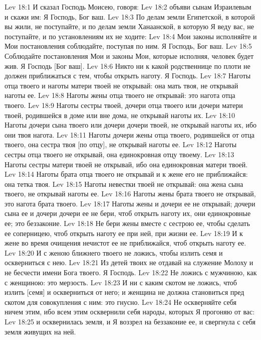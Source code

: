 \vs Lev 18:1 И сказал Господь Моисею, говоря:
\vs Lev 18:2 объяви сынам Израилевым и скажи им: Я Господь, Бог ваш.
\vs Lev 18:3 По делам земли Египетской, в которой вы жили, не поступайте, и по делам земли Ханаанской, в которую Я веду вас, не поступайте, и по установлениям их не ходите:
\vs Lev 18:4 Мои законы исполняйте и Мои постановления соблюдайте, поступая по ним. Я Господь, Бог ваш.
\vs Lev 18:5 Соблюдайте постановления Мои и законы Мои, которые исполняя, человек будет жив. Я Господь [Бог ваш].
\rsbpar\vs Lev 18:6 Никто ни к какой родственнице по плоти не должен приближаться с тем, чтобы открыть наготу. Я Господь.
\vs Lev 18:7 Наготы отца твоего и наготы матери твоей не открывай: она мать твоя, не открывай наготы ее.
\vs Lev 18:8 Наготы жены отца твоего не открывай: это нагота отца твоего.
\vs Lev 18:9 Наготы сестры твоей, дочери отца твоего или дочери матери твоей, родившейся в доме или вне дома, не открывай наготы их.
\vs Lev 18:10 Наготы дочери сына твоего или дочери дочери твоей, не открывай наготы их, ибо они твоя нагота.
\vs Lev 18:11 Наготы дочери жены отца твоего, родившейся от отца твоего, она сестра твоя [по отцу], не открывай наготы ее.
\vs Lev 18:12 Наготы сестры отца твоего не открывай, она единокровная отцу твоему.
\vs Lev 18:13 Наготы сестры матери твоей не открывай, ибо она единокровная матери твоей.
\vs Lev 18:14 Наготы брата отца твоего не открывай и к жене его не приближайся: она тетка твоя.
\vs Lev 18:15 Наготы невестки твоей не открывай: она жена сына твоего, не открывай наготы ее.
\vs Lev 18:16 Наготы жены брата твоего не открывай, это нагота брата твоего.
\vs Lev 18:17 Наготы жены и дочери ее не открывай; дочери сына ее и дочери дочери ее не бери, чтоб открыть наготу их, они единокровные ее; это беззаконие.
\vs Lev 18:18 Не бери жены вместе с сестрою ее, чтобы сделать ее соперницею, чтоб открыть наготу ее при ней, при жизни ее.
\vs Lev 18:19 И к жене во время очищения нечистот ее не приближайся, чтоб открыть наготу ее.
\vs Lev 18:20 И с женою ближнего твоего не ложись, чтобы излить семя и оскверниться с нею.
\vs Lev 18:21 Из детей твоих не отдавай на служение Молоху и не бесчести имени Бога твоего. Я Господь.
\vs Lev 18:22 Не ложись с мужчиною, как с женщиною: это мерзость.
\vs Lev 18:23 И ни с каким скотом не ложись, чтоб излить [семя] и оскверниться от него; и женщина не должна становиться пред скотом для совокупления с ним: это гнусно.
\rsbpar\vs Lev 18:24 Не оскверняйте себя ничем этим, ибо всем этим осквернили себя народы, которых Я прогоняю от вас:
\vs Lev 18:25 и осквернилась земля, и Я воззрел на беззаконие ее, и свергнула с себя земля живущих на ней.
